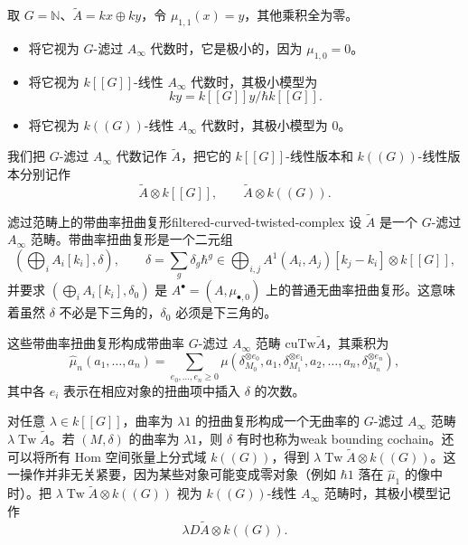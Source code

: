 \begin{example}[滤过代数的三种极小模型]\label{ex:filtered-minimal-models}
取 $G=\mathbb N$、$\widetilde A=kx\oplus ky$，令 $\mu_{1,1}(x)=y$，其他乘积全为零。
\begin{itemize}
  \item 将它视为 $G$-滤过 $A_\infty$ 代数时，它是极小的，因为 $\mu_{1,0}=0$。
  \item 将它视为 $k[[G]]$-线性 $A_\infty$ 代数时，其极小模型为
  \[
    ky=k[[G]]y/\hbar k[[G]].
  \]
  \item 将它视为 $k((G))$-线性 $A_\infty$ 代数时，其极小模型为 $0$。
\end{itemize}
我们把 $G$-滤过 $A_\infty$ 代数记作 $\widetilde A$，把它的 $k[[G]]$-线性版本和 $k((G))$-线性版本分别记作
\[
  \widetilde A\otimes k[[G]],\qquad \widetilde A\otimes k((G)).
\]
\end{example}

\begin{definition}{滤过范畴上的带曲率扭曲复形}{filtered-curved-twisted-complex}
设 $\widetilde A$ 是一个 $G$-滤过 $A_\infty$ 范畴。带曲率扭曲复形是一个二元组
\[
  \left(\bigoplus_iA_i[k_i],\delta\right),\qquad
  \delta=\sum_g\delta_g\hbar^g
  \in\bigoplus_{i,j}A^1(A_i,A_j)[k_j-k_i]\otimes k[[G]],
\]
并要求 $(\bigoplus_iA_i[k_i],\delta_0)$ 是 $A^\bullet=(A,\mu_{\bullet,0})$ 上的普通无曲率扭曲复形。这意味着虽然 $\delta$ 不必是下三角的，$\delta_0$ 必须是下三角的。
\end{definition}

这些带曲率扭曲复形构成带曲率 $G$-滤过 $A_\infty$ 范畴 $\mathrm{cuTw}\widetilde A$，其乘积为
\[
  \widehat\mu_n(a_1,\ldots,a_n)
  =\sum_{e_0,\ldots,e_n\geq0}
  \mu(\delta_{M_0}^{\otimes e_0},a_1,\delta_{M_1}^{\otimes e_1},
      a_2,\ldots,a_n,\delta_{M_n}^{\otimes e_n}),
\]
其中各 $e_i$ 表示在相应对象的扭曲项中插入 $\delta$ 的次数。

对任意 $\lambda\in k[[G]]$，曲率为 $\lambda1$ 的扭曲复形构成一个无曲率的 $G$-滤过 $A_\infty$ 范畴 $\lambda\operatorname{Tw}\widetilde A$。若 $(M,\delta)$ 的曲率为 $\lambda1$，则 $\delta$ 有时也称为weak bounding cochain。还可以将所有 Hom 空间张量上分式域 $k((G))$，得到 $\lambda\operatorname{Tw}\widetilde A\otimes k((G))$。这一操作并非无关紧要，因为某些对象可能变成零对象（例如 $\hbar1$ 落在 $\widehat\mu_1$ 的像中时）。把 $\lambda\operatorname{Tw}\widetilde A\otimes k((G))$ 视为 $k((G))$-线性 $A_\infty$ 范畴时，其极小模型记作
\[
  \lambda D\widetilde A\otimes k((G)).
\]

